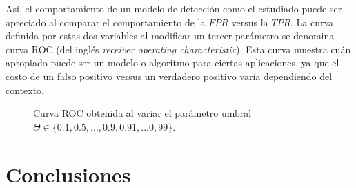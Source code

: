 \documentclass[12pt]{article}
\begin{document}
Así, el comportamiento de un modelo de detección como el estudiado puede ser
apreciado al comparar el comportamiento de la $FPR$ versus la $TPR$. La curva
definida por estas dos variables al modificar un tercer parámetro se denomina curva
ROC (del inglés \emph{receiver operating characteristic}). Esta curva muestra
cuán apropiado puede ser un modelo o algoritmo para ciertas aplicaciones, ya que
el costo de un falso positivo versus un verdadero positivo varía dependiendo del
contexto.

\begin{figure}[h]
    \centering

    \caption{Curva ROC obtenida al variar el parámetro umbral $\Theta \in \{ 0.1,0.5,...,0.9,0.91,...0,99\}$.}
\end{figure}

\section{Conclusiones}





\end{document}
